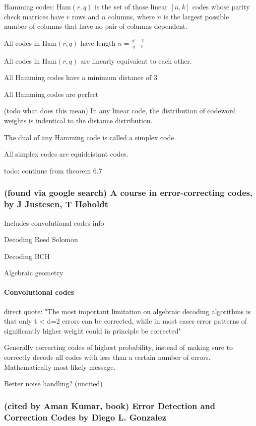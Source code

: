 \documentclass{article}
\begin{document}
Hamming codes: Ham$(r, q)$ is the set of those linear $[n, k]$ codes whose parity check matrices have $r$ rows and $n$ columns, where $n$ is the largest possible number of columns that have no pair of columns dependent.

All codes in Ham$(r, q)$ have length $n = \frac{q^r - 1}{q - 1}$

All codes in Ham$(r,q)$ are linearly equivalent to each other.

All Hamming codes have a minimum distance of 3

All Hamming codes are perfect

(todo what does this mean) In any linear code, the distribution of codeword weights is indentical to the distance distribution.

The dual of any Hamming code is called a simplex code. 	

All simplex codes are equideistant codes.

todo: continue from theorem 6.7

\subsubsection{(found via google search) A course in error-correcting codes, by J Justesen, T Høholdt }

Includes convolutional codes info

Decoding Reed Solomon

Decoding BCH

Algebraic geometry

\paragraph{Convolutional codes}

direct quote: "The most important limitation on algebraic decoding algorithms is that only t < d=2 errors can be corrected, while in most cases error patterns of significantly higher weight could in principle be corrected"

Generally correcting codes of highest probability, instead of making sure to correctly decode all codes with less than a certain number of errors. Mathematically most likely message.

Better noise handling? (uncited)

\subsubsection{(cited by Aman Kumar, book) Error Detection and Correction Codes by Diego L. Gonzalez}
\end{document}
